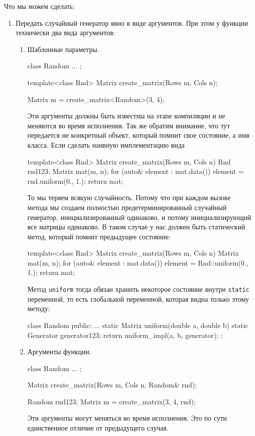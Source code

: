 Что мы можем сделать:
\begin{enumerate}
\item Передать случайный генератор явно в виде аргументов.
При этом у функции технически два вида аргументов:
\begin{enumerate}
\item Шаблонные параметры.
\begin{cppcode}
class Random { ... };

template<class Rnd>
Matrix create_matrix(Rows m, Cols n);

Matrix m = create_matrix<Random>(3, 4);
\end{cppcode}
Эти аргументы должны быть известны на этапе компиляции и не меняются во время исполнения.
Так же обратим внимание, что тут передается не конкретный объект, который помнит свое состояние, а имя класса.
Если сделать наивную имплементацию вида
\begin{cppcode}
template<class Rnd>
Matrix create_matrix(Rows m, Cols n) {
  Rnd rnd{123};
  Matrix mat(m, n);
  for (auto& element : mat.data())
    element = rnd.uniform(0., 1.);
  return mat;
}
\end{cppcode}
То мы теряем всякую случайность.
Потому что при каждом вызове метода мы создаем полностью предетерминированный случайный генератор, инициализированный одинаково, и потому инициализирующий все матрицы одинаково.
В таком случае у нас должен быть статический метод, который помнит предыдущее состояние:
\begin{cppcode}
template<class Rnd>
Matrix create_matrix(Rows m, Cols n) {
  Matrix mat(m, n);
  for (auto& element : mat.data())
    element = Rnd::uniform(0., 1.);
  return mat;
}
\end{cppcode}
Метод \verb"uniform" тогда обязан хранить некоторое состояние внутри \verb"static" переменной, то есть глобальной переменной, которая видна только этому методу:
\begin{cppcode}
class Random {
public:
  ...
  static Matrix uniform(double a, double b) {
    static Generator generator{123};
    return uniform_impl(a, b, generator);
  }
};
\end{cppcode}

\item Аргументы функции.
\begin{cppcode}
class Random { ... };

Matrix create_matrix(Rows m, Cols n, Random& rnd);

Random rnd{123};
Matrix m = create_matrix(3, 4, rnd);
\end{cppcode}
Эти аргументы могут меняться во время исполнения.
Это по сути единственное отличие от предыдущего случая. 
\end{enumerate}


\end{enumerate}
